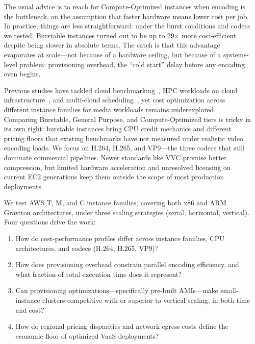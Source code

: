 \documentclass[conference]{IEEEtran}
\begin{document}
The usual advice is to reach for Compute-Optimized instances when encoding is the bottleneck, on the assumption that faster hardware means lower cost per job. In practice, things are less straightforward: under the burst conditions and codecs we tested, Burstable instances turned out to be up to 29$\times$ more cost-efficient despite being slower in absolute terms. The catch is that this advantage evaporates at scale---not because of a hardware ceiling, but because of a systems-level problem: provisioning overhead, the ``cold start'' delay before any encoding even begins.

Previous studies have tackled cloud benchmarking~\cite{b1}, HPC workloads on cloud infrastructure~\cite{b3}, and multi-cloud scheduling~\cite{b20}, yet cost optimization across different instance families for media workloads remains underexplored. Comparing Burstable, General Purpose, and Compute-Optimized tiers is tricky in its own right: burstable instances bring CPU credit mechanics and different pricing floors that existing benchmarks have not measured under realistic video encoding loads. We focus on H.264, H.265, and VP9---the three codecs that still dominate commercial pipelines. Newer standards like VVC promise better compression, but limited hardware acceleration and unresolved licensing on current EC2 generations keep them outside the scope of most production deployments.

We test AWS T, M, and C instance families, covering both x86 and ARM Graviton architectures, under three scaling strategies (serial, horizontal, vertical). Four questions drive the work:
\begin{enumerate}
\item[\textbf{RQ1.}] How do cost-performance profiles differ across instance families, CPU architectures, and codecs (H.264, H.265, VP9)?
\item[\textbf{RQ2.}] How does provisioning overhead constrain parallel encoding efficiency, and what fraction of total execution time does it represent?
\item[\textbf{RQ3.}] Can provisioning optimizations---specifically pre-built AMIs---make small-instance clusters competitive with or superior to vertical scaling, in both time and cost?
\item[\textbf{RQ4.}] How do regional pricing disparities and network egress costs define the economic floor of optimized VaaS deployments?
\end{enumerate}
\end{document}
